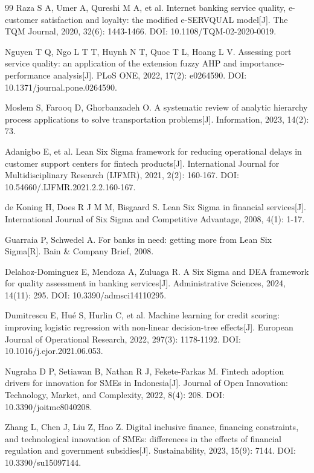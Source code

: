 \begin{thebibliography}{99}
 Raza S A, Umer A, Qureshi M A, et al. Internet banking service quality, e-customer satisfaction and loyalty: the modified e-SERVQUAL model[J]. The TQM Journal, 2020, 32(6): 1443-1466. DOI: 10.1108/TQM-02-2020-0019.

 Nguyen T Q, Ngo L T T, Huynh N T, Quoc T L, Hoang L V. Assessing port service quality: an application of the extension fuzzy AHP and importance-performance analysis[J]. PLoS ONE, 2022, 17(2): e0264590. DOI: 10.1371/journal.pone.0264590.

 Moslem S, Farooq D, Ghorbanzadeh O. A systematic review of analytic hierarchy process applications to solve transportation problems[J]. Information, 2023, 14(2): 73.

 Adanigbo E, et al. Lean Six Sigma framework for reducing operational delays in customer support centers for fintech products[J]. International Journal for Multidisciplinary Research (IJFMR), 2021, 2(2): 160-167. DOI: 10.54660/.IJFMR.2021.2.2.160-167.

 de Koning H, Does R J M M, Bisgaard S. Lean Six Sigma in financial services[J]. International Journal of Six Sigma and Competitive Advantage, 2008, 4(1): 1-17.

 Guarraia P, Schwedel A. For banks in need: getting more from Lean Six Sigma[R]. Bain \& Company Brief, 2008.

 Delahoz-Dominguez E, Mendoza A, Zuluaga R. A Six Sigma and DEA framework for quality assessment in banking services[J]. Administrative Sciences, 2024, 14(11): 295. DOI: 10.3390/admsci14110295.

 Dumitrescu E, Hué S, Hurlin C, et al. Machine learning for credit scoring: improving logistic regression with non-linear decision-tree effects[J]. European Journal of Operational Research, 2022, 297(3): 1178-1192. DOI: 10.1016/j.ejor.2021.06.053.

 Nugraha D P, Setiawan B, Nathan R J, Fekete-Farkas M. Fintech adoption drivers for innovation for SMEs in Indonesia[J]. Journal of Open Innovation: Technology, Market, and Complexity, 2022, 8(4): 208. DOI: 10.3390/joitmc8040208.

 Zhang L, Chen J, Liu Z, Hao Z. Digital inclusive finance, financing constraints, and technological innovation of SMEs: differences in the effects of financial regulation and government subsidies[J]. Sustainability, 2023, 15(9): 7144. DOI: 10.3390/su15097144.


\end{thebibliography}
